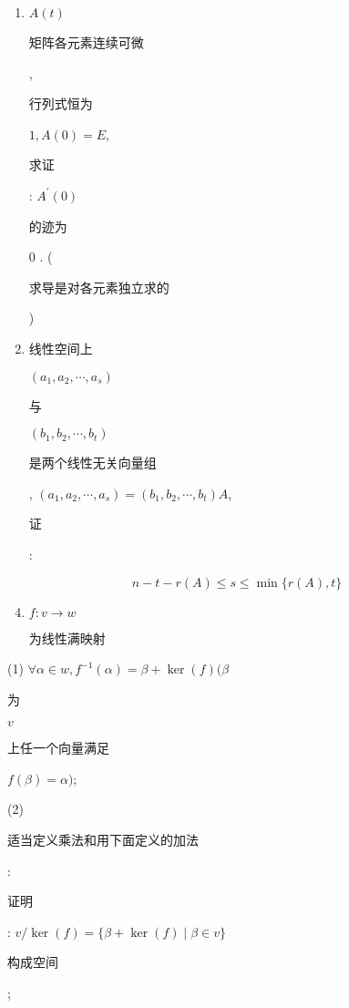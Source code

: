 \documentclass[10pt]{article}
\begin{document}
\begin{enumerate}
  \item $A(t)$ \begin{CJK}{UTF8}{mj}矩阵各元素连续可微\end{CJK}, \begin{CJK}{UTF8}{mj}行列式恒为\end{CJK} $1, A(0)=E$, \begin{CJK}{UTF8}{mj}求证\end{CJK}: $A^{\prime}(0)$ \begin{CJK}{UTF8}{mj}的迹为\end{CJK} 0 . (\begin{CJK}{UTF8}{mj}求导是对各元素独立求的\end{CJK})

  \item \begin{CJK}{UTF8}{mj}线性空间上\end{CJK} $\left(a_{1}, a_{2}, \cdots, a_{s}\right)$ \begin{CJK}{UTF8}{mj}与\end{CJK} $\left(b_{1}, b_{2}, \cdots, b_{t}\right)$ \begin{CJK}{UTF8}{mj}是两个线性无关向量组\end{CJK}, $\left(a_{1}, a_{2}, \cdots, a_{s}\right)=\left(b_{1}, b_{2}, \cdots, b_{t}\right) A$, \begin{CJK}{UTF8}{mj}证\end{CJK}:

\end{enumerate}
$$
n-t-r(A) \leqslant s \leqslant \min \{r(A), t\}
$$

\begin{enumerate}
  \setcounter{enumi}{3}
  \item $f: v \rightarrow w$ \begin{CJK}{UTF8}{mj}为线性满映射\end{CJK}
\end{enumerate}
(1) $\forall \alpha \in w, f^{-1}(\alpha)=\beta+\operatorname{ker}(f)(\beta$ \begin{CJK}{UTF8}{mj}为\end{CJK} $v$ \begin{CJK}{UTF8}{mj}上任一个向量满足\end{CJK} $f(\beta)=\alpha)$;

(2) \begin{CJK}{UTF8}{mj}适当定义乘法和用下面定义的加法\end{CJK}:

\begin{CJK}{UTF8}{mj}证明\end{CJK}: $v / \operatorname{ker}(f)=\{\beta+\operatorname{ker}(f) \mid \beta \in v\}$ \begin{CJK}{UTF8}{mj}构成空间\end{CJK};
\end{document}
